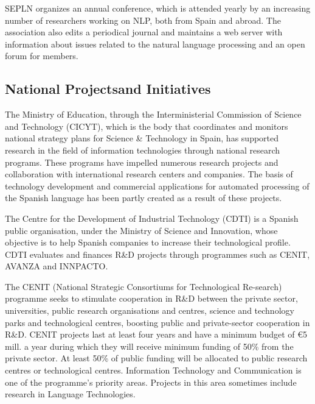 \begin{multicols}{2}
SEPLN organizes an annual conference, which is attended yearly by an increasing number of researchers working on NLP, both from Spain and abroad. The association also edits a periodical journal and maintains a web server with information about issues related to the natural language processing and an open forum for members. 

\subsection[National Projects and Initiatives]{National Projects\newline and Initiatives}

The Ministry of Education, through the Interministerial Commission of Science and Technology (CICYT), which is the body that coordinates and monitors national strategy plans for Science \& Technology in Spain, has supported research in the field of information technologies through national research programs. These programs have impelled numerous research projects and collaboration with international research centers and companies. The basis of technology development and commercial applications for automated processing of the Spanish language has been partly created as a result of these projects.

The Centre for the Development of Industrial Technology (CDTI) is a Spanish public organisation, under the Ministry of Science and Innovation, whose objective is to help Spanish companies to increase their technological profile. CDTI evaluates and finances R\&D projects through programmes such as CENIT, AVANZA and INNPACTO.

The CENIT (National Strategic Consortiums for Technological Re-search) programme seeks to stimulate cooperation in R\&D between the private sector, universities, public research organisations and centres, science and technology parks and technological centres, boosting public and private-sector cooperation in R\&D. CENIT projects last at least four years and have a minimum budget of €5 mill. a year during which they will receive minimum funding of 50\% from the private sector. At least 50\% of public funding will be allocated to public research centres or technological centres. Information Technology and Communication is one of the programme’s priority areas. Projects in this area sometimes include research in Language Technologies. 


\end{multicols}
